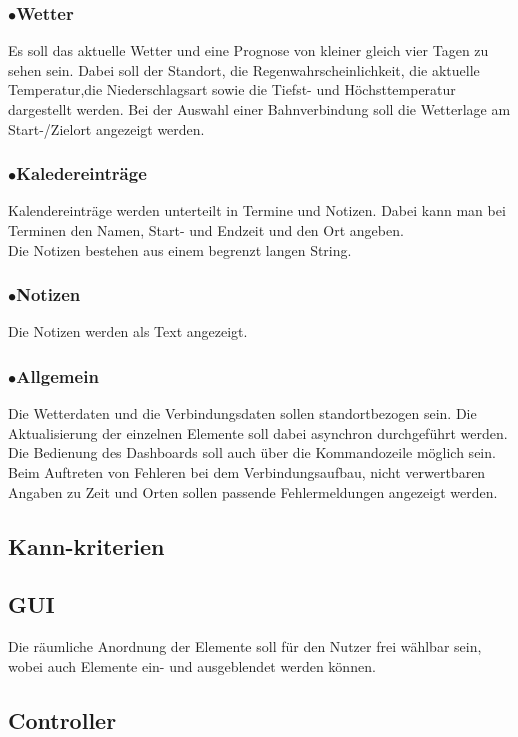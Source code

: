 \documentclass[12pt]{article}
\begin{document}
\subsubsection*{$\bullet$\quad Wetter}
Es soll das aktuelle Wetter und eine Prognose von kleiner gleich vier Tagen zu sehen sein. Dabei soll der Standort, die Regenwahrscheinlichkeit, die aktuelle Temperatur,die Niederschlagsart sowie die Tiefst- und Höchsttemperatur dargestellt werden. Bei der Auswahl einer Bahnverbindung soll die Wetterlage am Start-/Zielort angezeigt werden.
\subsubsection*{$\bullet$\quad Kaledereinträge}
Kalendereinträge werden unterteilt in Termine und Notizen. Dabei kann man bei Terminen den Namen, Start- und Endzeit und den Ort angeben.\\
Die Notizen bestehen aus einem begrenzt langen String.
\subsubsection*{$\bullet$\quad Notizen}
Die Notizen werden als Text angezeigt.
\subsubsection*{$\bullet$\quad Allgemein}
Die Wetterdaten und die Verbindungsdaten sollen standortbezogen sein. Die Aktualisierung der einzelnen Elemente soll dabei asynchron durchgeführt werden.\\
Die Bedienung des Dashboards soll auch über die Kommandozeile möglich sein.\\
Beim Auftreten von Fehleren bei dem Verbindungsaufbau, nicht verwertbaren Angaben zu Zeit und Orten sollen passende Fehlermeldungen angezeigt werden.

\subsection{Kann-kriterien}
\subsection*{GUI}
Die räumliche Anordnung der Elemente soll für den Nutzer frei wählbar sein, wobei auch Elemente ein- und ausgeblendet werden können.
\subsection*{Controller}
\end{document}
